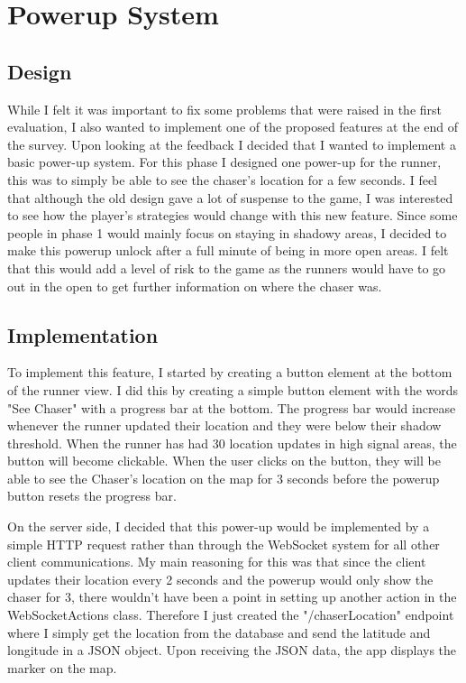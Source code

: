 \documentclass{l4proj}
\begin{document}
\section{Powerup System}

\subsection{Design}
While I felt it was important to fix some problems that were raised in the first evaluation, I also
wanted to implement one of the proposed features at the end of the survey. Upon looking at the feedback
I decided that I wanted to implement a basic power-up system. For this phase I designed one power-up for
the runner, this was to simply be able to see the chaser's location for a few seconds. I feel that although
the old design gave a lot of suspense to the game, I was interested to see how the player's strategies
would change with this new feature. Since some people in phase 1 would mainly focus on staying in shadowy
areas, I decided to make this powerup unlock after a full minute of being in more open areas. I felt that
this would add a level of risk to the game as the runners would have to go out in the open to get further
information on where the chaser was.

\subsection{Implementation}
To implement this feature, I started by creating a button element at the bottom of the runner view.
I did this by creating a simple button element with the words "See Chaser" with a progress bar at the bottom.
The progress bar would increase whenever the runner updated their location and they were below their shadow
threshold. When the runner has had 30 location updates in high signal areas, the button will become clickable.
When the user clicks on the button, they will be able to see the Chaser's location on the map for 3 seconds before
the powerup button resets the progress bar.

On the server side, I decided that this power-up would be implemented by a simple HTTP request rather than through
the WebSocket system for all other client communications. My main reasoning for this was that since the client
updates their location every 2 seconds and the powerup would only show the chaser for 3, there wouldn't have been
a point in setting up another action in the WebSocketActions class. Therefore I just created the "/chaserLocation"
endpoint where I simply get the location from the database and send the latitude and longitude in a JSON object.
Upon receiving the JSON data, the app displays the marker on the map.
\end{document}
